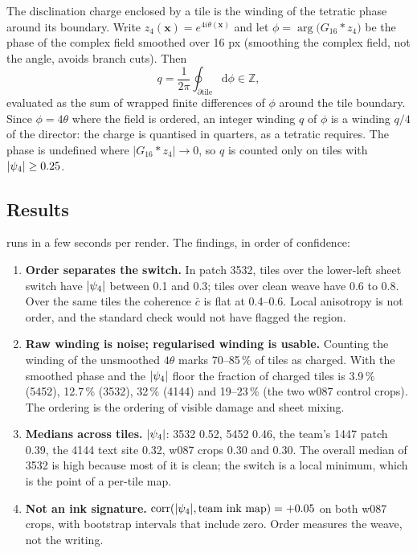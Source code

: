 The disclination charge enclosed by a tile is the winding of the tetratic phase around its boundary. Write $z_4(\mathbf{x})=e^{4i\theta(\mathbf{x})}$ and let $\phi=\arg\bigl(G_{16}*z_4\bigr)$ be the phase of the complex field smoothed over 16 px (smoothing the complex field, not the angle, avoids branch cuts). Then
\begin{equation}
q=\frac{1}{2\pi}\oint_{\partial\text{tile}}\mathrm{d}\phi\in\mathbb Z ,
\label{eq:charge}
\end{equation}
evaluated as the sum of wrapped finite differences of $\phi$ around the tile boundary. Since $\phi=4\theta$ where the field is ordered, an integer winding $q$ of $\phi$ is a winding $q/4$ of the director: the charge is quantised in quarters, as a tetratic requires. The phase is undefined where $|G_{16}*z_4|\to0$, so $q$ is counted only on tiles with $|\psi_4|\ge0.25$.

\subsection{Results}
 runs in a few seconds per render. The findings, in order of confidence:
\begin{enumerate}
\item \textbf{Order separates the switch.} In patch 3532, tiles over the lower-left sheet switch have $|\psi_4|$ between 0.1 and 0.3; tiles over clean weave have 0.6 to 0.8. Over the same tiles the coherence $\bar c$ is flat at \numrange{0.4}{0.6}. Local anisotropy is not order, and the standard check would not have flagged the region.
\item \textbf{Raw winding is noise; regularised winding is usable.} Counting the winding of the unsmoothed $4\theta$ marks 70--85\,\% of tiles as charged. With the smoothed phase and the $|\psi_4|$ floor the fraction of charged tiles is 3.9\,\% (5452), 12.7\,\% (3532), 32\,\% (4144) and 19--23\,\% (the two w087 control crops). The ordering is the ordering of visible damage and sheet mixing.
\item \textbf{Medians across tiles.} $|\psi_4|$: 3532 0.52, 5452 0.46, the team's 1447 patch 0.39, the 4144 text site 0.32, w087 crops 0.30 and 0.30. The overall median of 3532 is high because most of it is clean; the switch is a local minimum, which is the point of a per-tile map.
\item \textbf{Not an ink signature.} $\operatorname{corr}(|\psi_4|,\text{team ink map})=+0.05$ on both w087 crops, with bootstrap intervals that include zero. Order measures the weave, not the writing.
\end{enumerate}

